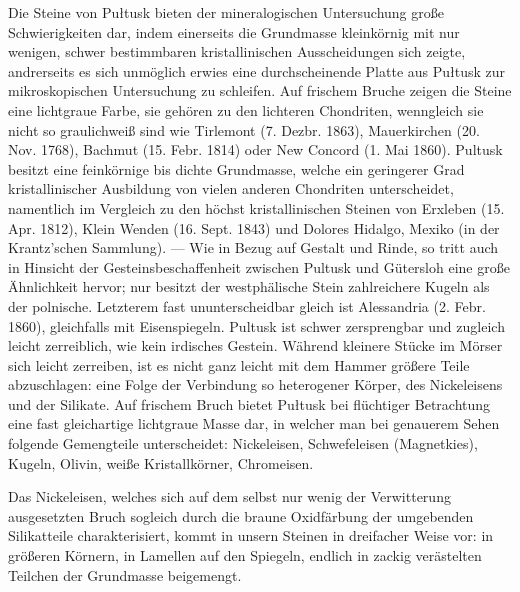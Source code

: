 \documentclass[a4paper, 11pt, oneside, german]{article}
\begin{document}
Die Steine von Pułtusk bieten der mineralogischen Untersuchung große Schwierigkeiten dar, indem einerseits die Grundmasse kleinkörnig mit nur wenigen, schwer bestimmbaren kristallinischen Ausscheidungen sich zeigte, andrerseits es sich unmöglich erwies eine durchscheinende Platte aus Pułtusk zur mikroskopischen Untersuchung zu schleifen. Auf frischem Bruche zeigen die Steine eine lichtgraue Farbe, sie gehören zu den lichteren Chondriten, wenngleich sie nicht so graulichweiß sind wie Tirlemont (7. Dezbr. 1863), Mauerkirchen (20. Nov. 1768), Bachmut (15. Febr. 1814) oder New Concord (1. Mai 1860). Pultusk besitzt eine feinkörnige bis dichte Grundmasse, welche ein geringerer Grad kristallinischer Ausbildung von vielen anderen Chondriten unterscheidet, namentlich im Vergleich zu den höchst kristallinischen Steinen von Erxleben (15. Apr. 1812), Klein Wenden (16. Sept. 1843) und Dolores Hidalgo, Mexiko (in der Krantz'schen Sammlung). --- Wie in Bezug auf Gestalt und Rinde, so tritt auch in Hinsicht der Gesteinsbeschaffenheit zwischen Pultusk und Gütersloh eine große Ähnlichkeit hervor; nur besitzt der westphälische Stein zahlreichere Kugeln als der polnische. Letzterem fast ununterscheidbar gleich ist Alessandria (2. Febr. 1860), gleichfalls mit Eisenspiegeln. Pultusk ist schwer zersprengbar und zugleich leicht zerreiblich, wie kein irdisches Gestein. Während kleinere Stücke im Mörser sich leicht zerreiben, ist es nicht ganz leicht mit dem Hammer größere Teile abzuschlagen: eine Folge der Verbindung so heterogener Körper, des Nickeleisens und der Silikate. Auf frischem Bruch bietet Pułtusk bei flüchtiger Betrachtung eine fast gleichartige lichtgraue Masse dar, in welcher man bei genauerem Sehen folgende Gemengteile unterscheidet: Nickeleisen, Schwefeleisen (Magnetkies), Kugeln, Olivin, weiße Kristallkörner, Chromeisen.

Das Nickeleisen, welches sich auf dem selbst nur wenig der Verwitterung ausgesetzten Bruch sogleich durch die braune Oxidfärbung der umgebenden Silikatteile charakterisiert, kommt in unsern Steinen in dreifacher Weise vor: in größeren Körnern, in Lamellen auf den Spiegeln, endlich in zackig verästelten Teilchen der Grundmasse beigemengt.
\end{document}
